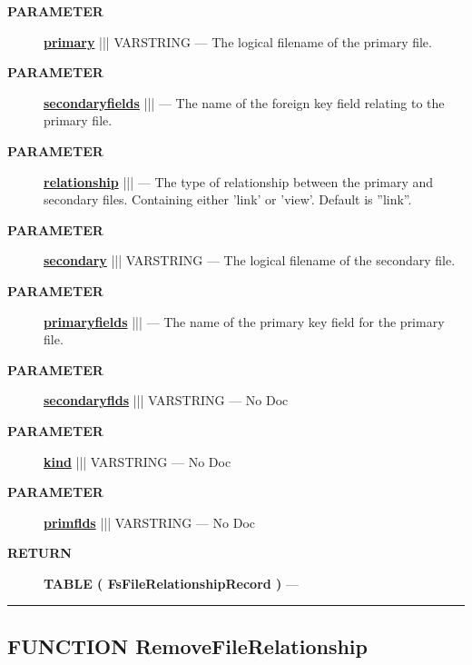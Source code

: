 \par
\begin{description}
\item [\colorbox{tagtype}{\color{white} \textbf{\textsf{PARAMETER}}}] \textbf{\underline{primary}} ||| VARSTRING --- The logical filename of the primary file.
\item [\colorbox{tagtype}{\color{white} \textbf{\textsf{PARAMETER}}}] \textbf{\underline{secondaryfields}} |||  --- The name of the foreign key field relating to the primary file.
\item [\colorbox{tagtype}{\color{white} \textbf{\textsf{PARAMETER}}}] \textbf{\underline{relationship}} |||  --- The type of relationship between the primary and secondary files. Containing either 'link' or 'view'. Default is ''link''.
\item [\colorbox{tagtype}{\color{white} \textbf{\textsf{PARAMETER}}}] \textbf{\underline{secondary}} ||| VARSTRING --- The logical filename of the secondary file.
\item [\colorbox{tagtype}{\color{white} \textbf{\textsf{PARAMETER}}}] \textbf{\underline{primaryfields}} |||  --- The name of the primary key field for the primary file.
\item [\colorbox{tagtype}{\color{white} \textbf{\textsf{PARAMETER}}}] \textbf{\underline{secondaryflds}} ||| VARSTRING --- No Doc
\item [\colorbox{tagtype}{\color{white} \textbf{\textsf{PARAMETER}}}] \textbf{\underline{kind}} ||| VARSTRING --- No Doc
\item [\colorbox{tagtype}{\color{white} \textbf{\textsf{PARAMETER}}}] \textbf{\underline{primflds}} ||| VARSTRING --- No Doc
\end{description}







\par
\begin{description}
\item [\colorbox{tagtype}{\color{white} \textbf{\textsf{RETURN}}}] \textbf{TABLE ( FsFileRelationshipRecord )} --- 
\end{description}




\rule{\linewidth}{0.5pt}
\subsection*{\textsf{\colorbox{headtoc}{\color{white} FUNCTION}
RemoveFileRelationship}}

